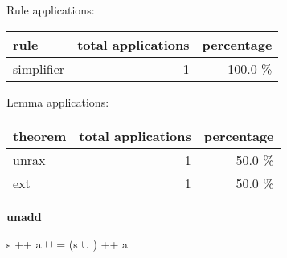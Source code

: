 \documentclass[a4paper]{article}
\begin{document}
Rule applications:

\begin{supertabular}{l|r|r}
rule	        & total applications & percentage \\ \hline
simplifier & 1 & 100.0 \% \\

\end{supertabular}

Lemma applications:

\begin{supertabular}{l|r|r}
theorem	        & total applications & percentage \\ \hline
unrax & 1 & 50.0 \% \\
ext & 1 & 50.0 \% \\

\end{supertabular}
\pagebreak

{\LARGE\bf unadd}\label{lemma-unadd}

\medskip

 \Fol s ++ a $\cup$  = (s $\cup$ ) ++ a
\end{document}
